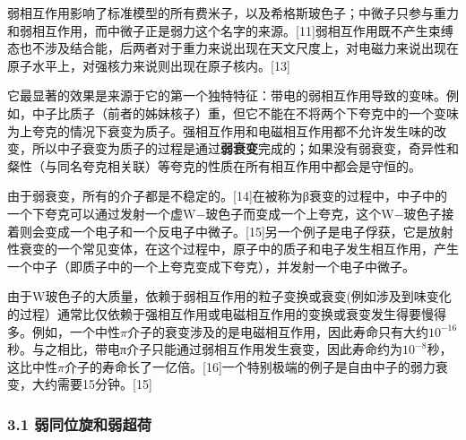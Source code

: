 弱相互作用影响了标准模型的所有费米子，以及希格斯玻色子；中微子只参与重力和弱相互作用，而中微子正是弱力这个名字的来源。[11]弱相互作用既不产生束缚态也不涉及结合能，后两者对于重力来说出现在天文尺度上，对电磁力来说出现在原子水平上，对强核力来说则出现在原子核内。[13]

它最显著的效果是来源于它的第一个独特特征：带电的弱相互作用导致的变味。例如，中子比质子（前者的姊妹核子）重，但它不能在不将两个下夸克中的一个变味为上夸克的情况下衰变为质子。强相互作用和电磁相互作用都不允许发生味的改变，所以中子衰变为质子的过程是通过\textbf{弱衰变}完成的；如果没有弱衰变，奇异性和粲性（与同名夸克相关联）等夸克的性质在所有相互作用中都会是守恒的。

由于弱衰变，所有的介子都是不稳定的。[14]在被称为β衰变的过程中，中子中的一个下夸克可以通过发射一个虚W−玻色子而变成一个上夸克，这个W−玻色子接着则会变成一个电子和一个反电子中微子。[15]另一个例子是电子俘获，它是放射性衰变的一个常见变体，在这个过程中，原子中的质子和电子发生相互作用，产生一个中子（即质子中的一个上夸克变成下夸克），并发射一个电子中微子。

由于W玻色子的大质量，依赖于弱相互作用的粒子变换或衰变(例如涉及到味变化的过程）通常比仅依赖于强相互作用或电磁相互作用的变换或衰变发生得要慢得多。例如，一个中性$\pi$介子的衰变涉及的是电磁相互作用，因此寿命只有大约$10^{-16}$秒。与之相比，带电π介子只能通过弱相互作用发生衰变，因此寿命约为$10^{-8}$秒，这比中性$\pi$介子的寿命长了一亿倍。[16]一个特别极端的例子是自由中子的弱力衰变，大约需要15分钟。[15]

\subsubsection{3.1 弱同位旋和弱超荷}
